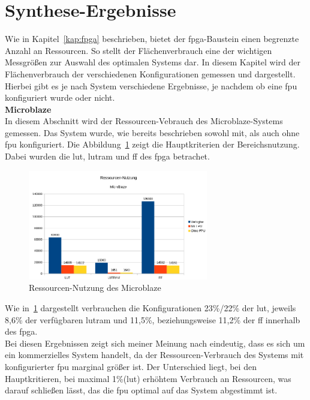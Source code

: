 \section{Synthese-Ergebnisse}\label{kap:synthese}
Wie in Kapitel~\ref{kap:fpga} beschrieben, bietet der \ac{fpga}-Baustein einen begrenzte Anzahl an Ressourcen. So stellt der Flächenverbrauch eine der wichtigen Messgrößen zur Auswahl des
optimalen Systems dar. In diesem Kapitel wird der Flächenverbrauch der verschiedenen Konfigurationen gemessen und dargestellt. Hierbei gibt es je nach System verschiedene Ergebnisse, je nachdem
ob eine \ac{fpu} konfiguriert wurde oder nicht.\\

\textbf{Microblaze}\\

In diesem Abschnitt wird der Ressourcen-Vebrauch des Microblaze-Systems gemessen. Das System wurde, wie bereits beschrieben sowohl mit, als auch ohne \ac{fpu} konfiguriert.
Die Abbildung~\ref{fig:ressourcenmb1} zeigt die Hauptkriterien der Bereichsnutzung. Dabei wurden die \ac{lut}, \ac{lutram} und \ac{ff} des \ac{fpga} betrachet.\\

\begin{figure}[H]
\centering
\includegraphics[width=0.7\textwidth]{Hauptteil/ressourcenmb1.png}
\caption{Ressourcen-Nutzung des Microblaze}
\label{fig:ressourcenmb1}
\end{figure}

Wie in~\ref{fig:ressourcenmb1} dargestellt verbrauchen die Konfigurationen 23\%/22\% der \ac{lut}, jeweils 8,6\% der verfügbaren \ac{lutram} und 11,5\%, beziehungsweise 11,2\% der \ac{ff}
innerhalb des \ac{fpga}.\\
Bei diesen Ergebnissen zeigt sich meiner Meinung nach eindeutig, dass es sich um ein kommerzielles System handelt, da der Ressourcen-Verbrauch des Systems mit konfigurierter \ac{fpu}
marginal größer ist. Der Unterschied liegt, bei den Hauptkritieren, bei maximal 1\%(\ac{lut}) erhöhtem Verbrauch an Ressourcen, was darauf schließen lässt, das die \ac{fpu} optimal auf das System
abgestimmt ist.\\

